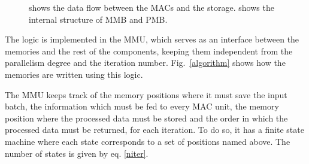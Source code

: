\documentclass[conference,compsoc]{IEEEtran}
\begin{document}
\begin{figure}[!t]
\centering
{}
\hfil
\centering
{}
\caption{\protect{} shows the data flow between the MACs and the
  storage. \protect{} shows the internal structure of MMB and PMB.}
\label{muxes}
\end{figure}

The logic is implemented in the MMU, which serves as an interface between
the memories and the rest of the components, keeping them independent from the
parallelism degree and the iteration number. Fig.~\ref{algorithm} shows how
the memories are written using this logic. 

The MMU keeps track of the memory
positions where it must save the input batch, the information which must be fed
to every MAC unit, the memory position where the processed data must be
stored and the order in which the processed data must be returned, for each iteration.
To do so, it has a finite state machine where each state corresponds to a set of
positions named above. The number of states is given by eq. \ref{niter}.
\end{document}
